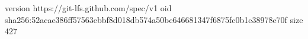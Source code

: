 version https://git-lfs.github.com/spec/v1
oid sha256:52acae386ff57563ebbf8d018db574a50be646681347f6875fc0b1e38978e70f
size 427
